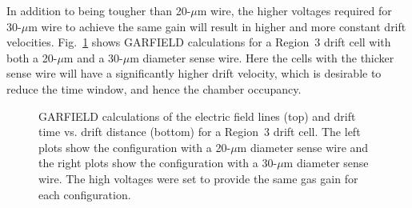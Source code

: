 In addition to being tougher than 20-$\mu$m wire, the higher voltages
required for 30-$\mu$m wire to achieve the same gain will result in
higher and more constant drift velocities.
Fig.~\ref{garfield-20-vs-30-micron} shows GARFIELD calculations for a Region~3 drift cell
with both a 20-$\mu$m and a 30-$\mu$m diameter sense wire.  Here the
cells with the thicker sense wire will have a significantly higher drift 
velocity, which is desirable to reduce the time window, and hence the 
chamber occupancy.

\begin{figure}[htbp]
\vspace{13.0cm}
\caption{\small{GARFIELD calculations of the electric field lines (top)
and drift time vs. drift distance (bottom) for a Region~3 drift cell.  The 
left plots show the configuration with a 20-$\mu$m diameter sense wire and 
the right plots show the configuration with a 30-$\mu$m diameter sense wire.
The high voltages were set to provide the same gas gain for each
configuration.}}
\label{garfield-20-vs-30-micron}
\end{figure}



 

